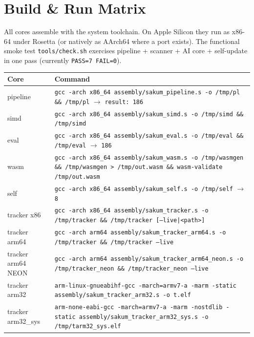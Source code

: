 \section{Build \& Run Matrix}\label{ch:build}

All cores assemble with the system toolchain.  On Apple Silicon they run as
x86-64 under Rosetta (or natively as AArch64 where a port exists).  The
functional smoke test \texttt{tools/check.sh} exercises pipeline + scanner +
AI core + self-update in one pass (currently \texttt{PASS=7 FAIL=0}).

\begin{table}[H]
\centering
\footnotesize
\begin{tabularx}{\textwidth}{lX}
\toprule
Core & Command \\
\midrule
pipeline & \texttt{gcc -arch x86\_64 assembly/sakum\_pipeline.s -o /tmp/pl \&\& /tmp/pl} $\to$ \texttt{result: 186} \\
simd & \texttt{gcc -arch x86\_64 assembly/sakum\_simd.s -o /tmp/simd \&\& /tmp/simd} \\
eval & \texttt{gcc -arch x86\_64 assembly/sakum\_eval.s -o /tmp/eval \&\& /tmp/eval} $\to$ \texttt{186} \\
wasm & \texttt{gcc -arch x86\_64 assembly/sakum\_wasm.s -o /tmp/wasmgen \&\& /tmp/wasmgen > /tmp/out.wasm \&\& wasm-validate /tmp/out.wasm} \\
self & \texttt{gcc -arch x86\_64 assembly/sakum\_self.s -o /tmp/self} $\to$ \texttt{8} \\
tracker x86 & \texttt{gcc -arch x86\_64 assembly/sakum\_tracker.s -o /tmp/tracker \&\& /tmp/tracker [--live|<path>]} \\
tracker arm64 & \texttt{gcc -arch arm64 assembly/sakum\_tracker\_arm64.s -o /tmp/tracker \&\& /tmp/tracker --live} \\
tracker arm64 NEON & \texttt{gcc -arch arm64 assembly/sakum\_tracker\_arm64\_neon.s -o /tmp/tracker\_neon \&\& /tmp/tracker\_neon --live} \\
tracker arm32 & \texttt{arm-linux-gnueabihf-gcc -march=armv7-a -marm -static assembly/sakum\_tracker\_arm32.s -o t.elf} \\
tracker arm32\_sys & \texttt{arm-none-eabi-gcc -march=armv7-a -marm -nostdlib -static assembly/sakum\_tracker\_arm32\_sys.s -o /tmp/tarm32\_sys.elf} \\

\end{tabularx}
\end{table}
